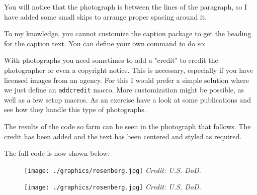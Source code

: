 You will notice that the photograph is between the lines of the paragraph, so I have added some small skips to arrange proper spacing around it.


To my knowledge, you cannot customize the caption package to get the heading for the caption text. You can define your own command to do so:
\begin{phdverbatim}
\newcommand\captionx[2]{\par%
     \leavevmode 
     \caption*{\textsc{#1}\par%
     \textit{#1}}%
}
\end{phdverbatim}

\DeclareDocumentCommand{}

With photographs you need sometimes to add a "credit" to credit the photographer or even a copyright notice. This is necessary, especially if you have licensed images from an agency. For this I would prefer a simple solution where we
just define an \verb+addcredit+ macro. More customization might be possible, as well as a few setup macros. As an exercise have a look at some publications and see how they handle this type of photographs.

\begin{teX}
\newcommand\addcredit[1]{%
   \vspace*{-10.5pt}%
   \scriptsize
   \hfill\hfill
   \textit{Credit: #1}%
}
\end{teX}

\providecommand\addcredit[1]{%
 \scriptsize%
 \vspace*{-10.5pt}%
 \hfill\hfill\textit{Credit: #1}%
 \vspace{10pt}
}

The results of the code so farm can be seen in the photograph that follows. The credit has been added and
the text has been centered and styled as required.

The full code is now shown below:

\begin{teX}
\begin{figure}[htp]
  \centering
  \captionsetup{skip=0pt,  justification=centering}%
  \texttt{[image: ./graphics/rosenberg.jpg]}%
  \addcredit{U.S. DoD.}%
\end{figure}
\end{teX}

\begin{figure}[htp]
  \centering
  \captionsetup{name=Photo, labelsep=period, skip=0pt, position=top, textfont=scriptsize,    justification=centering}%
\texttt{[image: ./graphics/rosenberg.jpg]}%
\addcredit{U.S. DoD.}%
\vspace{10pt}
\end{figure}

